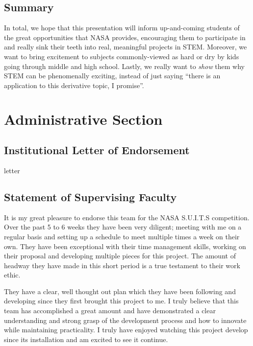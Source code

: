 \documentclass{article}
\let\Oldsection\section
\renewcommand{\section}{\FloatBarrier\Oldsection}
\let\Oldsubsection\subsection
\renewcommand{\subsection}{\FloatBarrier\Oldsubsection}
\begin{document}
\subsection{Summary}

In total, we hope that this presentation will inform up-and-coming students of the great opportunities that NASA provides, encouraging them to participate in and really sink their teeth into real, meaningful projects in STEM. Moreover, we want to bring excitement to subjects commonly-viewed as hard or dry by kids going through middle and high school. Lastly, we really want to \textit{show} them why STEM can be phenomenally exciting, instead of just saying “there is an application to this derivative topic, I promise”.

\newpage

\section{Administrative Section}

\subsection{Institutional Letter of Endorsement}

letter

\newpage

\subsection{Statement of Supervising Faculty}


It is my great pleasure to endorse this team for the NASA S.U.I.T.S competition. Over the past 5 to 6 weeks they have been very diligent; meeting with me on a regular basis and setting up a schedule to meet multiple times a week on their own. They have been exceptional with their time management skills, working on their proposal and developing multiple pieces for this project. The amount of headway they have made in this short period is a true testament to their work ethic.  

They have a clear, well thought out plan which they have been following and developing since they first brought this project to me. I truly believe that this team has accomplished a great amount and have demonstrated a clear understanding and strong grasp of the development process and how to innovate while maintaining practicality. I truly have enjoyed watching this project develop since its installation and am excited to see it continue.
\end{document}

